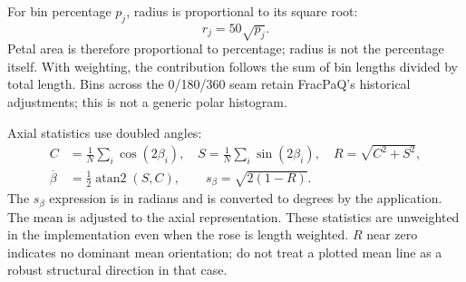 For bin percentage \(p_j\), radius is proportional to its square root:
\begin{equation}r_j=50\sqrt{p_j}.\end{equation}
Petal area is therefore proportional to percentage; radius is not the percentage itself. With weighting, the contribution follows the sum of bin lengths divided by total length. Bins across the 0/180/360 seam retain FracPaQ's historical adjustments; this is not a generic polar histogram.

Axial statistics use doubled angles:
\begin{align}
C&=\frac1N\sum_i\cos(2\beta_i),\quad
S=\frac1N\sum_i\sin(2\beta_i),\quad R=\sqrt{C^2+S^2},\\
\overline\beta&=\frac12\operatorname{atan2}(S,C),\qquad
s_\beta=\sqrt{2(1-R)}.
\end{align}
The \(s_\beta\) expression is in radians and is converted to degrees by the application. The mean is adjusted to the axial representation. These statistics are unweighted in the implementation even when the rose is length weighted. \(R\) near zero indicates no dominant mean orientation; do not treat a plotted mean line as a robust structural direction in that case.
